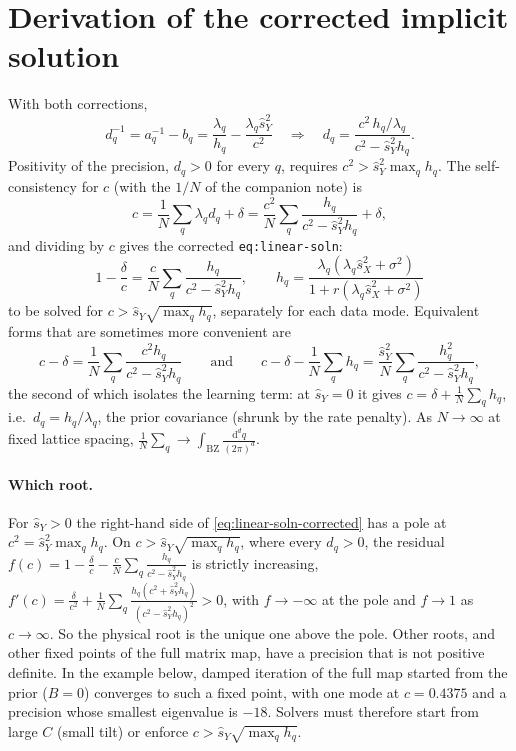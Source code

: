 \documentclass[11pt,a4paper]{article}
\begin{document}
\section{Derivation of the corrected implicit solution}
With both corrections,
\begin{equation}
  d_q^{-1} = a_q^{-1} - b_q = \frac{\lambda_q}{h_q} - \frac{\lambda_q\hat s_Y^2}{c^2}
  \quad\Longrightarrow\quad
  d_q = \frac{c^2\,h_q/\lambda_q}{c^2 - \hat s_Y^2 h_q}.
\end{equation}
Positivity of the precision, $d_q > 0$ for every $q$, requires $c^2 > \hat s_Y^2\max_q h_q$.
The self-consistency for $c$ (with the $1/N$ of the companion note) is
\begin{equation}
  c = \frac1N\sum_q\lambda_q d_q + \delta = \frac{c^2}{N}\sum_q\frac{h_q}{c^2-\hat s_Y^2h_q} + \delta ,
\end{equation}
and dividing by $c$ gives the corrected \texttt{eq:linear-soln}:
\begin{equation}
  \boxed{\;1 - \frac{\delta}{c} = \frac{c}{N}\sum_q\frac{h_q}{c^2 - \hat s_Y^2h_q},
  \qquad
  h_q = \frac{\lambda_q(\lambda_q\hat s_X^2 + \sigma^2)}{1 + r(\lambda_q\hat s_X^2+\sigma^2)}\;}
  \label{eq:linear-soln-corrected}
\end{equation}
to be solved for $c > \hat s_Y\sqrt{\max_q h_q}$, separately for each data mode. Equivalent forms that are sometimes more convenient are
\begin{equation}
  c - \delta = \frac1N\sum_q \frac{c^2 h_q}{c^2 - \hat s_Y^2 h_q}
  \qquad\text{and}\qquad
  c - \delta - \frac1N\sum_q h_q = \frac{\hat s_Y^2}{N}\sum_q\frac{h_q^2}{c^2 - \hat s_Y^2h_q},
\end{equation}
the second of which isolates the learning term: at $\hat s_Y = 0$ it gives $c = \delta + \frac1N\sum_q h_q$, i.e.\ $d_q = h_q/\lambda_q$, the prior covariance (shrunk by the rate penalty).
As $N\to\infty$ at fixed lattice spacing, $\frac1N\sum_q\to\int_{\mathrm{BZ}}\frac{\mathrm d^dq}{(2\pi)^d}$.

\paragraph{Which root.}
For $\hat s_Y > 0$ the right-hand side of \eqref{eq:linear-soln-corrected} has a pole at $c^2 = \hat s_Y^2\max_q h_q$. On $c > \hat s_Y\sqrt{\max_q h_q}$, where every $d_q>0$, the residual
$f(c) = 1 - \frac{\delta}{c} - \frac cN\sum_q\frac{h_q}{c^2-\hat s_Y^2h_q}$ is strictly increasing,
$f'(c) = \frac{\delta}{c^2} + \frac1N\sum_q\frac{h_q(c^2+\hat s_Y^2h_q)}{(c^2-\hat s_Y^2h_q)^2} > 0$,
with $f\to-\infty$ at the pole and $f\to1$ as $c\to\infty$. So the physical root is the unique one above the pole.
Other roots, and other fixed points of the full matrix map, have a precision that is not positive definite. In the example below, damped iteration of the full map started from the prior ($B=0$) converges to such a fixed point, with one mode at $c = 0.4375$ and a precision whose smallest eigenvalue is $-18$. Solvers must therefore start from large $C$ (small tilt) or enforce $c > \hat s_Y\sqrt{\max_q h_q}$.
\end{document}
